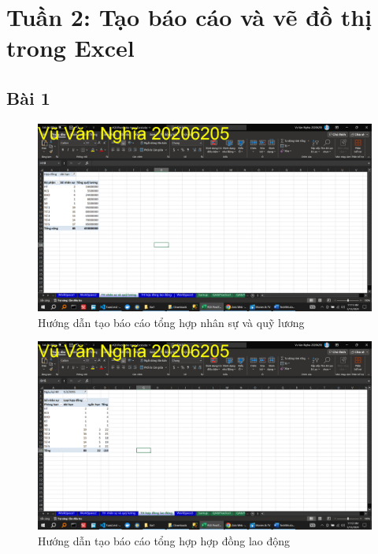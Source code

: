 \documentclass{article}
\begin{document}
\tableofcontents
\newpage
\listoffigures
\newpage
\section{Tuần 2: Tạo báo cáo và vẽ đồ thị trong Excel}
\subsection{Bài 1}

\begin{figure}[H]
\centering
\includegraphics[scale = 0.15]{Bai1/HuongDan/0.png}
\caption{Hướng dẫn tạo báo cáo tổng hợp nhân sự và quỹ lương}
\end{figure}

\begin{figure}[H]
\centering
\includegraphics[scale = 0.15]{Bai1/HuongDan/1.png}
\caption{Hướng dẫn tạo báo cáo tổng hợp hợp đồng lao động}
\end{figure}
\end{document}

